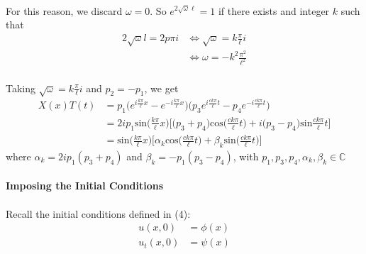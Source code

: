 \documentclass[letter]{article}
\begin{document}
    \paragraph{}For this reason, we discard $\omega=0$. So $e^{2\sqrt{\omega}\ell}=1$ if there exists and integer $k$ such that
    \begin{equation}
        \begin{split}
            2\sqrt{\omega}l = 2p\pi i 
            &\Longleftrightarrow \sqrt\omega =k\frac{\pi}{\ell}i\\
            &\Longleftrightarrow \omega = -k^2\frac{\pi^2}{\ell^2}
        \end{split}
    \end{equation}
    \paragraph{}Taking $\sqrt{\omega}=k\frac{\pi}{\ell}i$ and $p_2=-p_1$, we get
    \begin{equation*}
        \begin{split}
            X(x)T(t) 
            &= p_1\bigg(e^{i\frac{k\pi}{\ell}x}-e^{-i\frac{k\pi}{\ell}x}\bigg)\bigg(p_3e^{i\frac{ck\pi}{\ell}t}-p_4e^{-i\frac{ck\pi}{\ell}t}\bigg)\\
            &= 2ip_1\text{sin}\bigg(\frac{k\pi}{\ell}x\bigg)\bigg[\big(p_3+p_4\big)\text{cos}\bigg(\frac{ck\pi}{\ell}t\bigg)+i\big(p_3-p_4\big)\text{sin}\frac{ck\pi}{\ell}t\bigg]\\
            &= \text{sin}\bigg(\frac{k\pi}{\ell}x\bigg)\bigg[\alpha_k\text{cos}\bigg(\frac{ck\pi}{\ell}t\bigg)+\beta_k\text{sin}\bigg(\frac{ck\pi}{\ell}t\bigg)\bigg]
        \end{split}
    \end{equation*}
    where $\alpha_k=2ip_1(p_3+p_4)$ and $\beta_k=-p_1(p_3-p_4)$, with $p_1,p_3,p_4,\alpha_k,\beta_k\in\mathbb{C}$\\
    
    
    \paragraph{}\textbf{Imposing the Initial Conditions}
    \paragraph{} Recall the initial conditions defined in (4):
        \begin{equation*}
        \begin{split}
            u(x,0) &= \phi(x)\\
            u_t(x,0) &= \psi(x)
        \end{split}
    \end{equation*}
\end{document}
